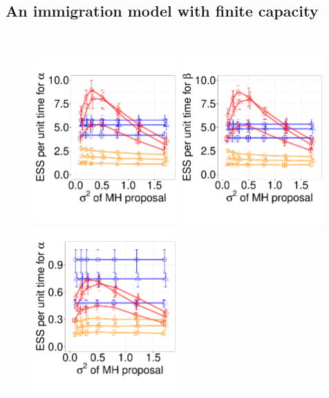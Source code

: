 \subsection{An immigration model with finite capacity}\label{sec:immig}~
  \begin{figure}%
  \centering
  \begin{minipage}[hp]{0.69\linewidth}
  \centering
    \includegraphics [width=0.49\textwidth, angle=0]{figs/q_3_alpha.pdf}
    \includegraphics [width=0.49\textwidth, angle=0]{figs/q_3_beta.pdf}
    \vspace{-.1 in}
  \centering
    \includegraphics [width=0.49\textwidth, angle=0]{figs/q_10_alpha.pdf}

\end{minipage}
\end{figure}

